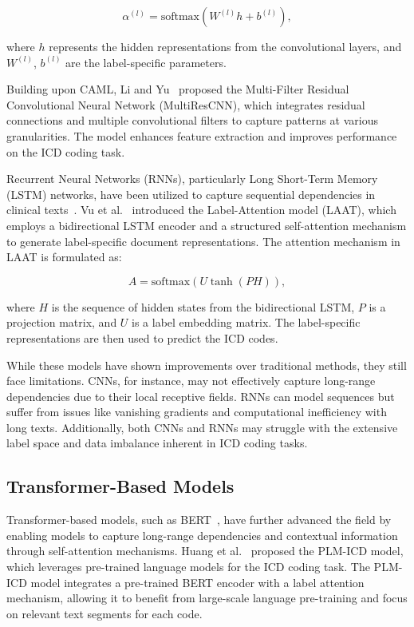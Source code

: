 \documentclass[12pt,a4paper]{report}
\begin{document}
\begin{equation}
\alpha^{(l)} = \text{softmax}(W^{(l)} h + b^{(l)}),
\end{equation}

where $h$ represents the hidden representations from the convolutional layers, and $W^{(l)}$, $b^{(l)}$ are the label-specific parameters.

Building upon CAML, Li and Yu~\cite{li2020multi} proposed the Multi-Filter Residual Convolutional Neural Network (MultiResCNN), which integrates residual connections and multiple convolutional filters to capture patterns at various granularities. The model enhances feature extraction and improves performance on the ICD coding task.

Recurrent Neural Networks (RNNs), particularly Long Short-Term Memory (LSTM) networks, have been utilized to capture sequential dependencies in clinical texts~\cite{hochreiter1997long}. Vu et al.~\cite{vu2020label} introduced the Label-Attention model (LAAT), which employs a bidirectional LSTM encoder and a structured self-attention mechanism to generate label-specific document representations. The attention mechanism in LAAT is formulated as:

\begin{equation}
A = \text{softmax}(U \tanh(P H)),
\end{equation}

where $H$ is the sequence of hidden states from the bidirectional LSTM, $P$ is a projection matrix, and $U$ is a label embedding matrix. The label-specific representations are then used to predict the ICD codes.

While these models have shown improvements over traditional methods, they still face limitations. CNNs, for instance, may not effectively capture long-range dependencies due to their local receptive fields. RNNs can model sequences but suffer from issues like vanishing gradients and computational inefficiency with long texts. Additionally, both CNNs and RNNs may struggle with the extensive label space and data imbalance inherent in ICD coding tasks.

\subsection{Transformer-Based Models}

Transformer-based models, such as BERT~\cite{devlin2019bert}, have further advanced the field by enabling models to capture long-range dependencies and contextual information through self-attention mechanisms. Huang et al.~\cite{huang2022plm} proposed the PLM-ICD model, which leverages pre-trained language models for the ICD coding task. The PLM-ICD model integrates a pre-trained BERT encoder with a label attention mechanism, allowing it to benefit from large-scale language pre-training and focus on relevant text segments for each code.
\end{document}
